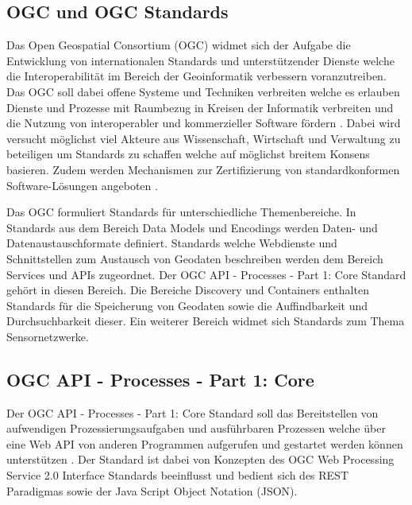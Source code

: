 \subsection{OGC und OGC Standards}
Das Open Geospatial Consortium (OGC) widmet sich der Aufgabe die Entwicklung von internationalen Standards und unterstützender Dienste welche die Interoperabilität im 
Bereich der Geoinformatik verbessern voranzutreiben. Das OGC soll dabei offene Systeme und Techniken verbreiten welche es erlauben Dienste und Prozesse mit Raumbezug
in Kreisen der Informatik verbreiten und die Nutzung von interoperabler und kommerzieller Software fördern \cite{ogc_bylaws}. Dabei wird versucht möglichst viel
Akteure aus Wissenschaft, Wirtschaft und Verwaltung zu beteiligen um Standards zu schaffen welche auf möglichst breitem Konsens basieren. Zudem werden 
Mechanismen zur Zertifizierung von standardkonformen Software-Lösungen angeboten \cite{ogc_bylaws}.

Das OGC formuliert Standards für unterschiedliche Themenbereiche. In Standards aus dem Bereich Data Models und Encodings werden Daten- und Datenaustauschformate
definiert. Standards welche Webdienste und Schnittstellen zum Austausch von Geodaten beschreiben werden dem Bereich Services und APIs zugeordnet. 
Der OGC API - Processes - Part 1: Core Standard gehört in diesen Bereich. Die Bereiche Discovery und Containers enthalten Standards für die Speicherung von Geodaten
sowie die Auffindbarkeit und Durchsuchbarkeit dieser. Ein weiterer Bereich widmet sich Standards zum Thema Sensornetzwerke.

\subsection{OGC API - Processes - Part 1: Core}
Der OGC API - Processes - Part 1: Core Standard soll das Bereitstellen von aufwendigen Prozessierungsaufgaben und ausführbaren Prozessen welche über eine Web API
 von anderen Programmen aufgerufen und gestartet werden können unterstützen \cite{ogc_api_processes_core}. Der Standard ist dabei von Konzepten des 
OGC Web Processing Service 2.0 Interface Standards beeinflusst und bedient sich des REST Paradigmas sowie der Java Script Object Notation (JSON). \\

